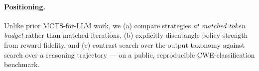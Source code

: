 \paragraph{Positioning.}
Unlike prior MCTS-for-LLM work, we (a) compare strategies \emph{at matched token
budget} rather than matched iterations, (b) explicitly disentangle policy strength
from reward fidelity, and (c) contrast search over the output taxonomy against
search over a reasoning trajectory --- on a public, reproducible CWE-classification
benchmark.
